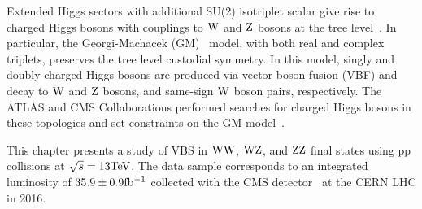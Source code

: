 Extended Higgs sectors with additional SU(2) isotriplet scalar give rise to charged Higgs bosons with couplings to $\mathrm{W}$ and $\mathrm{Z}$ bosons at the tree level~\cite{CE1,CE2}. In particular, the Georgi-Machacek (GM)~\cite{GEORGI1985463} model, with both real and complex triplets,  preserves the tree level custodial symmetry. In this model, singly and doubly charged Higgs bosons are produced via vector boson fusion (VBF) and decay to $\mathrm{W}$ and $\mathrm{Z}$ bosons, and same-sign $\mathrm{W}$ boson pairs, respectively. The ATLAS and CMS Collaborations performed searches for charged Higgs bosons in these topologies and set constraints on the GM model~\cite{Sirunyan:2017ret,Sirunyan:2017sbn,PhysRevLett.114.231801}.

This chapter presents a study of VBS in $\mathrm{W}\mathrm{W}$, $\mathrm{W}\mathrm{Z}$, and $\mathrm{Z}\mathrm{Z}$ final states using pp collisions at $\sqrt{s}=13\mathrm{TeV}$. The data sample corresponds to an integrated luminosity of $35.9 \pm 0.9\mathrm{fb^{-1}}$ collected with the CMS detector~\cite{Chatrchyan:2008zzk} at the CERN LHC in 2016. 






